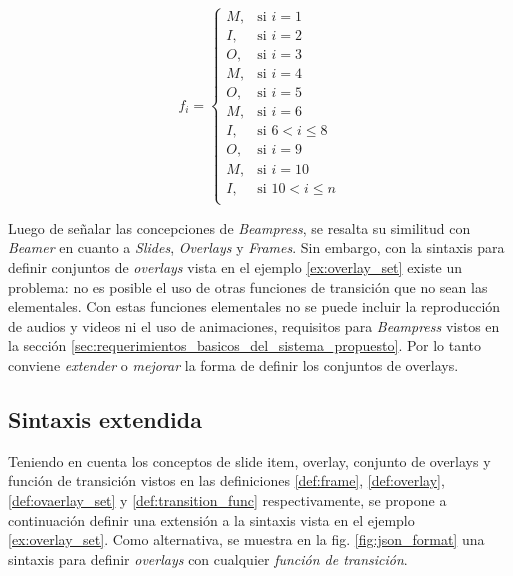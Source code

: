 		\begin{equation}
		\label{eq:example}
			f_i = 
			\begin{cases}
				M, & \mbox{si }i = 1 \\
				I, & \mbox{si }i = 2  \\
				O, & \mbox{si }i = 3  \\
				M, & \mbox{si }i = 4  \\
				O, & \mbox{si }i = 5  \\
				M, & \mbox{si }i = 6  \\
				I, & \mbox{si } 6 < i \leq 8  \\
				O, & \mbox{si }i = 9  \\
				M, & \mbox{si }i = 10  \\
				I, & \mbox{si } 10 < i \leq n  \\
			\end{cases}
		\end{equation}




	Luego de señalar las concepciones de \textit{Beampress}, se resalta su similitud con \textit{Beamer} en cuanto a \textit{Slides}, \textit{Overlays} y \textit{Frames}. Sin embargo, con la sintaxis para definir conjuntos de \textit{overlays} vista en el ejemplo \ref{ex:overlay_set} existe un problema: no es posible el uso de otras funciones de transición que no sean las elementales. Con estas funciones elementales no se puede incluir la reproducción de audios y videos ni el uso de animaciones, requisitos para \textit{Beampress} vistos en la sección \ref{sec:requerimientos_basicos_del_sistema_propuesto}. Por lo tanto conviene \textit{extender} o \textit{mejorar} la forma de definir los conjuntos de overlays.



	\subsection{Sintaxis extendida} %
	\label{subsec:sintaxis_extendida}
	

	Teniendo en cuenta los conceptos de slide item, overlay, conjunto de overlays y función de transición vistos en las definiciones \ref{def:frame}, \ref{def:overlay}, \ref{def:ovaerlay_set} y \ref{def:transition_func} respectivamente, se propone a continuación definir una extensión a la sintaxis vista en el ejemplo \ref{ex:overlay_set}. Como alternativa, se muestra en la fig. \ref{fig:json_format} una sintaxis para definir \textit{overlays} con cualquier \textit{función de transición}.

